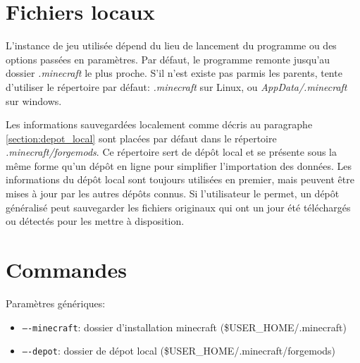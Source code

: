 \documentclass{article}
\begin{document}
\section{Fichiers locaux}
L'instance de jeu utilisée dépend du lieu de lancement du programme ou des options passées en paramètres.
Par défaut, le programme remonte jusqu'au dossier \textit{.minecraft} le plus proche.
S'il n'est existe pas parmis les parents, tente d'utiliser le répertoire par défaut: \textit{.minecraft} sur Linux, ou \textit{AppData/.minecraft} sur windows.

Les informations sauvegardées localement comme décris au paragraphe \ref{section:depot_local} sont placées par défaut dans le répertoire \textit{.minecraft/forgemods}.
Ce répertoire sert de dépôt local et se présente sous la même forme qu'un dépôt en ligne pour simplifier l'importation des données.
Les informations du dépôt local sont toujours utilisées en premier, mais peuvent être mises à jour par les autres dépôts connus.
Si l'utilisateur le permet, un dépôt généralisé peut sauvegarder les fichiers originaux qui ont un jour été téléchargés ou détectés pour les mettre à disposition.


\section{Commandes}
Paramètres génériques:
\begin{itemize}
    \item \texttt{----minecraft}: dossier d'installation minecraft (\$USER\_HOME/.minecraft)
    \item \texttt{----depot}: dossier de dépot local (\$USER\_HOME/.minecraft/forgemods)
\end{itemize}
\end{document}
